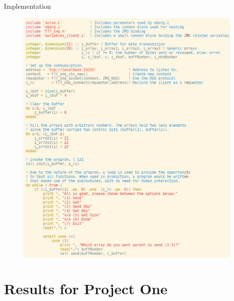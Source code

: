 \documentclass{beamer}
\begin{document}
\begin{frame}{Implementation}
\begin{figure}[h!]
\begin{minipage}{.5\columnwidth}
            \includegraphics[width=1\columnwidth]{child_com}
        \end{minipage}
        \end{figure}
    \end{frame}



    \section{Results for Project One}
\end{document}
